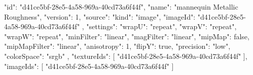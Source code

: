 {
  "id": "d41ce5bf-28e5-4a58-969a-40cd73a6f44f",
  "name": "mannequin Metallic Roughness",
  "version": 1,
  "source": {
    "kind": "image",
    "imageId": "d41ce5bf-28e5-4a58-969a-40cd73a6f44f"
  },
  "settings": {
    "wrapU": "repeat",
    "wrapV": "repeat",
    "wrapW": "repeat",
    "minFilter": "linear",
    "magFilter": "linear",
    "mipMap": false,
    "mipMapFilter": "linear",
    "anisotropy": 1,
    "flipY": true,
    "precision": "low",
    "colorSpace": "srgb"
  },
  "textureIds": [
    "d41ce5bf-28e5-4a58-969a-40cd73a6f44f"
  ],
  "imageIds": [
    "d41ce5bf-28e5-4a58-969a-40cd73a6f44f"
  ]
}
